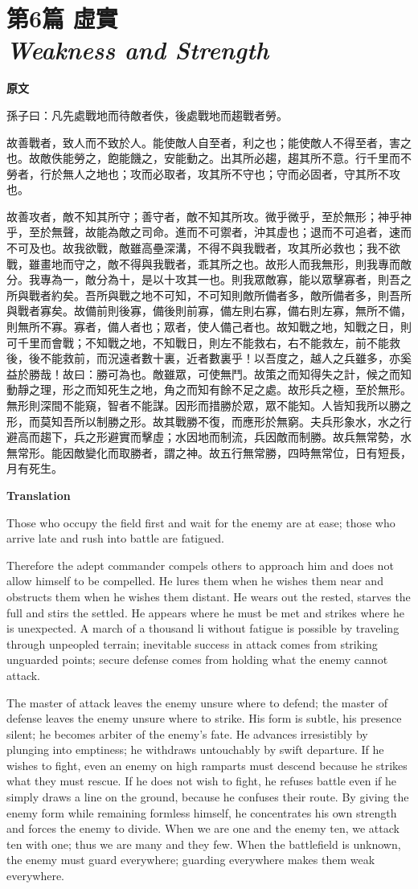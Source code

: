 \documentclass[12pt]{book}
\newcommand{\chapterentry}[4]{%
  \chapter[\texorpdfstring{#1}{#1}]{\texorpdfstring{#1\\\Large\textit{#2}}{#1 — #2}}%
  \noindent\textbf{原文}\par
  #3

  \bigskip
  \noindent\textbf{Translation}\par
  #4
}
\begin{document}
\chapterentry{第6篇 虛實}{Weakness and Strength}{%
孫子曰：凡先處戰地而待敵者佚，後處戰地而趨戰者勞。

故善戰者，致人而不致於人。能使敵人自至者，利之也；能使敵人不得至者，害之也。故敵佚能勞之，飽能饑之，安能動之。出其所必趨，趨其所不意。行千里而不勞者，行於無人之地也；攻而必取者，攻其所不守也；守而必固者，守其所不攻也。

故善攻者，敵不知其所守；善守者，敵不知其所攻。微乎微乎，至於無形；神乎神乎，至於無聲，故能為敵之司命。進而不可禦者，沖其虛也；退而不可追者，速而不可及也。故我欲戰，敵雖高壘深溝，不得不與我戰者，攻其所必救也；我不欲戰，雖畫地而守之，敵不得與我戰者，乖其所之也。故形人而我無形，則我專而敵分。我專為一，敵分為十，是以十攻其一也。則我眾敵寡，能以眾擊寡者，則吾之所與戰者約矣。吾所與戰之地不可知，不可知則敵所備者多，敵所備者多，則吾所與戰者寡矣。故備前則後寡，備後則前寡，備左則右寡，備右則左寡，無所不備，則無所不寡。寡者，備人者也；眾者，使人備己者也。故知戰之地，知戰之日，則可千里而會戰；不知戰之地，不知戰日，則左不能救右，右不能救左，前不能救後，後不能救前，而況遠者數十裏，近者數裏乎！以吾度之，越人之兵雖多，亦奚益於勝哉！故曰：勝可為也。敵雖眾，可使無鬥。故策之而知得失之計，候之而知動靜之理，形之而知死生之地，角之而知有餘不足之處。故形兵之極，至於無形。無形則深間不能窺，智者不能謀。因形而措勝於眾，眾不能知。人皆知我所以勝之形，而莫知吾所以制勝之形。故其戰勝不復，而應形於無窮。夫兵形象水，水之行避高而趨下，兵之形避實而擊虛；水因地而制流，兵因敵而制勝。故兵無常勢，水無常形。能因敵變化而取勝者，謂之神。故五行無常勝，四時無常位，日有短長，月有死生。}{%
Those who occupy the field first and wait for the enemy are at ease; those who arrive late and rush into battle are fatigued.

Therefore the adept commander compels others to approach him and does not allow himself to be compelled. He lures them when he wishes them near and obstructs them when he wishes them distant. He wears out the rested, starves the full and stirs the settled. He appears where he must be met and strikes where he is unexpected. A march of a thousand li without fatigue is possible by traveling through unpeopled terrain; inevitable success in attack comes from striking unguarded points; secure defense comes from holding what the enemy cannot attack.

The master of attack leaves the enemy unsure where to defend; the master of defense leaves the enemy unsure where to strike. His form is subtle, his presence silent; he becomes arbiter of the enemy’s fate. He advances irresistibly by plunging into emptiness; he withdraws untouchably by swift departure. If he wishes to fight, even an enemy on high ramparts must descend because he strikes what they must rescue. If he does not wish to fight, he refuses battle even if he simply draws a line on the ground, because he confuses their route. By giving the enemy form while remaining formless himself, he concentrates his own strength and forces the enemy to divide. When we are one and the enemy ten, we attack ten with one; thus we are many and they few. When the battlefield is unknown, the enemy must guard everywhere; guarding everywhere makes them weak everywhere.

}
\end{document}
